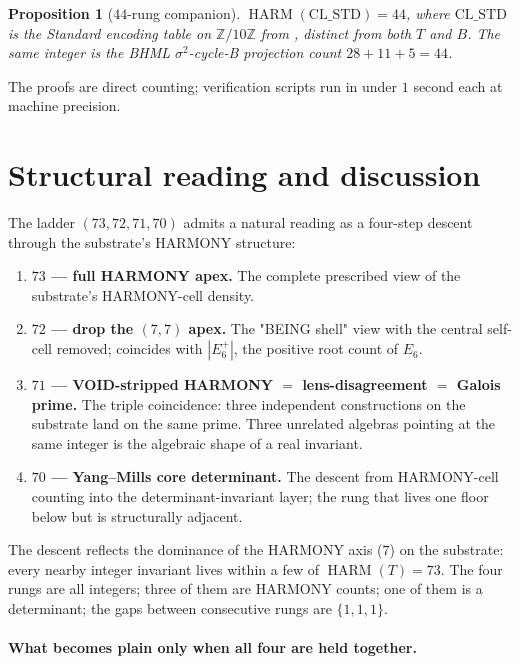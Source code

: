\documentclass[11pt,reqno]{amsart}
\newtheorem{proposition}[theorem]{Proposition}
\theoremstyle{definition}
\newcommand{\Z}{\mathbb{Z}}
\DeclareMathOperator{\HARM}{HARM}
\begin{document}
\begin{proposition}[$44$-rung companion]
\label{prop:44}
$\HARM(\mathrm{CL\_STD}) = 44$, where $\mathrm{CL\_STD}$ is the
Standard encoding table on $\Z/10\Z$ from
\cite{Sanders2026LensInvariance}, distinct from both $T$ and $B$.
The same integer is the BHML $\sigma^2$-cycle-B projection count
$28 + 11 + 5 = 44$.
\end{proposition}

The proofs are direct counting; verification scripts run in under
$1$ second each at machine precision.

\section{Structural reading and discussion}
\label{sec:reading}

The ladder $(73, 72, 71, 70)$ admits a natural reading as a four-step
descent through the substrate's HARMONY structure:

\begin{enumerate}[label=(\arabic*),leftmargin=*]
\item \textbf{$73$ — full HARMONY apex.} The complete prescribed view
  of the substrate's HARMONY-cell density.
\item \textbf{$72$ — drop the $(7,7)$ apex.} The "BEING shell" view
  with the central self-cell removed; coincides with $|E_6^+|$, the
  positive root count of $E_6$.
\item \textbf{$71$ — VOID-stripped HARMONY $=$ lens-disagreement $=$
  Galois prime.} The triple coincidence: three independent
  constructions on the substrate land on the same prime. Three
  unrelated algebras pointing at the same integer is the algebraic
  shape of a real invariant.
\item \textbf{$70$ — Yang--Mills core determinant.} The descent from
  HARMONY-cell counting into the determinant-invariant layer; the
  rung that lives one floor below but is structurally adjacent.
\end{enumerate}

The descent reflects the dominance of the HARMONY axis ($7$) on the
substrate: every nearby integer invariant lives within a few of
$\HARM(T) = 73$. The four rungs are all integers; three of them are
HARMONY counts; one of them is a determinant; the gaps between
consecutive rungs are $\{1, 1, 1\}$.

\paragraph{What becomes plain only when all four are held together.}
\end{document}
